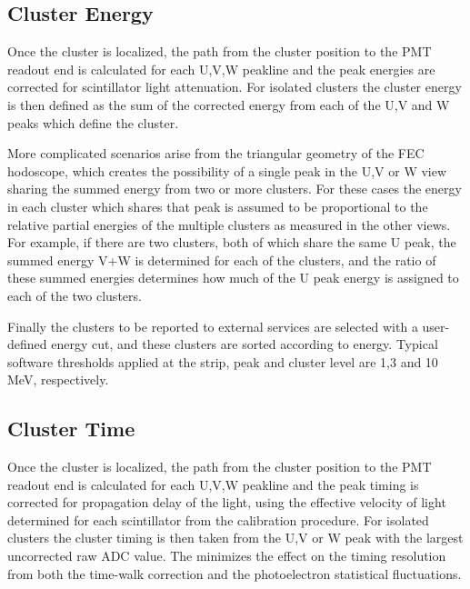 \subsection {Cluster Energy}

Once the cluster is localized, the path from the cluster position to the PMT readout end is calculated for each U,V,W peakline and the peak energies are corrected for scintillator light attenuation.  For isolated clusters the cluster energy is then defined as the sum of the corrected energy from each of the U,V and W peaks which define the cluster.  

More complicated scenarios arise from the triangular geometry of the FEC hodoscope, which creates the possibility of a single peak in the U,V or W view sharing the summed energy from two or more clusters.  For these cases the energy in each cluster which shares that peak is assumed to be proportional to the relative partial energies of the multiple clusters as measured in the other views.  For example, if there are two clusters, both of which share the same U peak, the summed energy V+W is determined for each of the clusters, and the ratio of these summed energies determines how much of the U peak energy is  assigned to each of the two clusters.  

Finally the clusters to be reported to external services are selected with a user-defined energy cut, and these clusters are sorted according to energy. Typical software thresholds applied at the strip, peak and cluster level are 1,3 and 10 MeV, respectively. 

\subsection {Cluster Time}

Once the cluster is localized, the path from the cluster position to the PMT readout end is calculated for each U,V,W peakline and the peak timing is corrected for propagation delay of the light, using the effective velocity of light determined for each scintillator from the calibration procedure.  For isolated clusters the cluster timing is then taken from the U,V or W peak with the largest uncorrected raw ADC value.  The minimizes the effect on the timing resolution from both the time-walk correction and the photoelectron statistical fluctuations.

